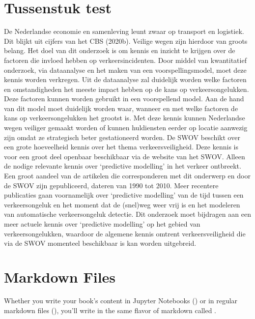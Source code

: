 \documentclass[letterpaper,10pt,english]{jupyterBook}
\begin{document}
\section{Tussenstuk test}
\label{\detokenize{introductie:tussenstuk-test}}
\sphinxAtStartPar
De Nederlandse economie en samenleving leunt zwaar op transport en logistiek. Dit blijkt uit cijfers van het CBS (2020b).  Veilige wegen zijn hierdoor van groots belang. Het doel van dit onderzoek is om kennis en inzicht te krijgen over de factoren die invloed hebben op verkeersincidenten. Door middel van kwantitatief onderzoek, via data\sphinxhyphen{}analyse en het maken van een voorspellingsmodel, moet deze kennis worden verkregen. Uit de data\sphinxhyphen{}analyse zal duidelijk worden welke factoren en omstandigheden het meeste impact hebben op de kans op verkeersongelukken. Deze factoren kunnen worden gebruikt in een voorspellend model. Aan de hand van dit model moet duidelijk worden waar, wanneer en met welke factoren de kans op verkeersongelukken het grootst is. Met deze kennis kunnen Nederlandse wegen veiliger gemaakt worden of kunnen huldiensten eerder op locatie aanwezig zijn omdat ze strategisch beter gestationeerd worden.
De SWOV beschikt over een grote hoeveelheid kennis over het thema verkeersveiligheid. Deze kennis is voor een groot deel openbaar beschikbaar via de website van het SWOV.  Alleen de nodige relevante kennis over ‘predictive modelling’ in het verkeer ontbreekt. Een groot aandeel van de artikelen die corresponderen met dit onderwerp en door de SWOV zijn gepubliceerd, dateren van 1990  tot 2010. Meer recentere publicaties gaan voornamelijk over ‘predictive modelling’ van de tijd tussen een verkeersongeluk en het moment dat de (snel)weg weer vrij is en het modeleren van automatische verkeersongeluk detectie. Dit onderzoek moet bijdragen aan een meer actuele kennis over ‘predictive modelling’ op het gebied van verkeersongelukken, waardoor de algemene kennis omtrent verkeersveiligheid die via de SWOV momenteel beschikbaar is kan worden uitgebreid.


\section{Markdown Files}
\label{\detokenize{markdown:markdown-files}}\label{\detokenize{markdown::doc}}
\sphinxAtStartPar
Whether you write your book’s content in Jupyter Notebooks () or
in regular markdown files (), you’ll write in the same flavor of markdown
called .
\end{document}
